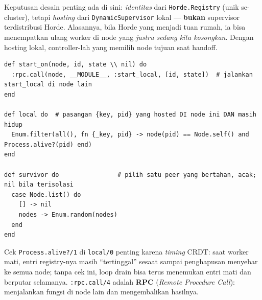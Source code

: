 \documentclass[11pt]{article}
\newcommand{\code}[1]{\texttt{\small #1}}
\newcommand{\istilah}[1]{\textbf{#1}}
\begin{document}
Keputusan desain penting ada di sini: \emph{identitas} dari \code{Horde.Registry} (unik se-cluster),
tetapi \emph{hosting} dari \code{DynamicSupervisor} lokal --- \textbf{bukan} supervisor terdistribusi
Horde. Alasannya, bila Horde yang menjadi tuan rumah, ia bisa menempatkan ulang worker di node yang
\emph{justru sedang kita kosongkan}. Dengan hosting lokal, controller-lah yang memilih node tujuan saat
handoff.
\begin{lstlisting}[style=ex]
def start_on(node, id, state \\ nil) do
  :rpc.call(node, __MODULE__, :start_local, [id, state])  # jalankan start_local di node lain
end

def local do  # pasangan {key, pid} yang hosted DI node ini DAN masih hidup
  Enum.filter(all(), fn {_key, pid} -> node(pid) == Node.self() and Process.alive?(pid) end)
end

def survivor do                # pilih satu peer yang bertahan, acak; nil bila terisolasi
  case Node.list() do
    [] -> nil
    nodes -> Enum.random(nodes)
  end
end
\end{lstlisting}
Cek \code{Process.alive?/1} di \code{local/0} penting karena \emph{timing} CRDT: saat worker mati,
entri registry-nya masih ``tertinggal'' sesaat sampai penghapusan menyebar ke semua node; tanpa cek
ini, loop drain bisa terus menemukan entri mati dan berputar selamanya. \code{:rpc.call/4} adalah
\istilah{RPC} (\emph{Remote Procedure Call}): menjalankan fungsi di node lain dan mengembalikan
hasilnya.
\end{document}
